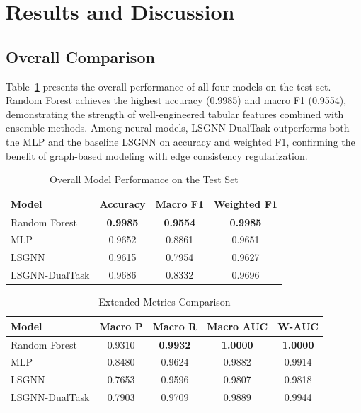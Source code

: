\documentclass[conference]{IEEEtran}
\begin{document}
\section{Results and Discussion}

\subsection{Overall Comparison}

Table~\ref{tab:results} presents the overall performance of all four models on the test set. Random Forest achieves the highest accuracy (0.9985) and macro F1 (0.9554), demonstrating the strength of well-engineered tabular features combined with ensemble methods. Among neural models, LSGNN-DualTask outperforms both the MLP and the baseline LSGNN on accuracy and weighted F1, confirming the benefit of graph-based modeling with edge consistency regularization.

\begin{table}[t]
\centering
\caption{Overall Model Performance on the Test Set}
\label{tab:results}
\begin{tabular}{@{}lccc@{}}
\toprule
\textbf{Model} & \textbf{Accuracy} & \textbf{Macro F1} & \textbf{Weighted F1} \\
\midrule
Random Forest     & \textbf{0.9985} & \textbf{0.9554} & \textbf{0.9985} \\
MLP               & 0.9652          & 0.8861          & 0.9651          \\
LSGNN             & 0.9615          & 0.7954          & 0.9627          \\
LSGNN-DualTask    & 0.9686          & 0.8332          & 0.9696          \\
\bottomrule
\end{tabular}
\end{table}

\begin{table}[t]
\centering
\caption{Extended Metrics Comparison}
\label{tab:extended}
\begin{tabular}{@{}lcccc@{}}
\toprule
\textbf{Model} & \textbf{Macro P} & \textbf{Macro R} & \textbf{Macro AUC} & \textbf{W-AUC} \\
\midrule
Random Forest     & 0.9310 & \textbf{0.9932} & \textbf{1.0000} & \textbf{1.0000} \\
MLP               & 0.8480 & 0.9624          & 0.9882          & 0.9914          \\
LSGNN             & 0.7653 & 0.9596          & 0.9807          & 0.9818          \\
LSGNN-DualTask    & 0.7903 & 0.9709          & 0.9889          & 0.9944          \\
\bottomrule
\end{tabular}
\end{table}
\end{document}
